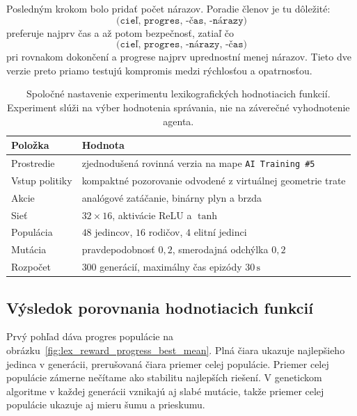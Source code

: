 Posledným krokom bolo pridať počet nárazov. Poradie členov je tu dôležité:
\[
    \texttt{(cieľ, progres, -čas, -nárazy)}
\]
preferuje najprv čas a až potom bezpečnosť, zatiaľ čo
\[
    \texttt{(cieľ, progres, -nárazy, -čas)}
\]
pri rovnakom dokončení a progrese najprv uprednostní menej nárazov. Tieto dve verzie preto priamo testujú kompromis medzi rýchlosťou a opatrnosťou.

\begin{table}[htbp]
    \centering
    \small
    \renewcommand{\arraystretch}{1.12}
    \caption[Nastavenie lexikografického porovnania GA]{Spoločné nastavenie experimentu lexikografických hodnotiacich funkcií. Experiment slúži na výber hodnotenia správania, nie na záverečné vyhodnotenie agenta.}
    \label{tab:lex_reward_sweep_setup}
    \begin{tabular}{>{\raggedright\arraybackslash}p{}
                    >{\raggedright\arraybackslash}p{}}
        \toprule
        Položka & Hodnota \\
        \midrule
        Prostredie & zjednodušená rovinná verzia \Trackmania{} na mape \texttt{AI Training \#5} \\
        Vstup politiky & kompaktné pozorovanie odvodené z virtuálnej geometrie trate \\
        Akcie & analógové zatáčanie, binárny plyn a brzda \\
        Sieť & \(32\times16\), aktivácie ReLU a \(\tanh\) \\
        Populácia & \(48\) jedincov, \(16\) rodičov, \(4\) elitní jedinci \\
        Mutácia & pravdepodobnosť \(0{,}2\), smerodajná odchýlka \(0{,}2\) \\
        Rozpočet & \(300\) generácií, maximálny čas epizódy \(30\,\mathrm{s}\) \\
        \bottomrule
    \end{tabular}
\end{table}

\subsection{Výsledok porovnania hodnotiacich funkcií}

Prvý pohľad dáva progres populácie na obrázku~\ref{fig:lex_reward_progress_best_mean}. Plná čiara ukazuje najlepšieho jedinca v generácii, prerušovaná čiara priemer celej populácie. Priemer celej populácie zámerne nečítame ako stabilitu najlepších riešení. V genetickom algoritme v každej generácii vznikajú aj slabé mutácie, takže priemer celej populácie ukazuje aj mieru šumu a prieskumu.

